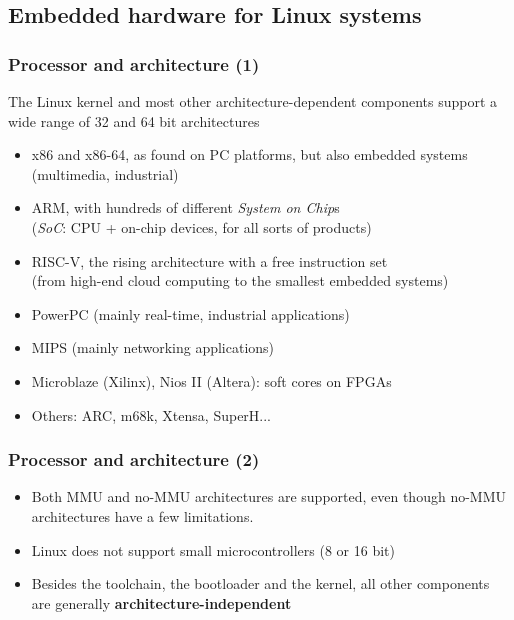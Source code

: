 
\subsection{Embedded hardware for Linux systems}

\begin{frame}
  \frametitle{Processor and architecture (1)}
  The Linux kernel and most other architecture-dependent
  components support a wide range of 32 and 64 bit architectures
  \begin{itemize}
  \item x86 and x86-64, as found on PC platforms, but also embedded systems
    (multimedia, industrial)
  \item ARM, with hundreds of different {\em System on Chip}s\\
        ({\em SoC}: CPU + on-chip devices, for all sorts of products)
  \item RISC-V, the rising architecture with a free instruction set\\
        (from high-end cloud computing to the smallest embedded systems)
  \item PowerPC (mainly real-time, industrial applications)
  \item MIPS (mainly networking applications)
  \item Microblaze (Xilinx), Nios II (Altera): soft cores on FPGAs
  \item Others: ARC, m68k, Xtensa, SuperH...
  \end{itemize}
\end{frame}

\begin{frame}
  \frametitle{Processor and architecture (2)}
  \begin{itemize}
  \item Both MMU and no-MMU architectures are supported, even though
    no-MMU architectures have a few limitations.
  \item Linux does not support small microcontrollers (8 or 16 bit)
  \item Besides the toolchain, the bootloader and the kernel, all
    other components are generally {\bf architecture-independent}
  \end{itemize}
\end{frame}

